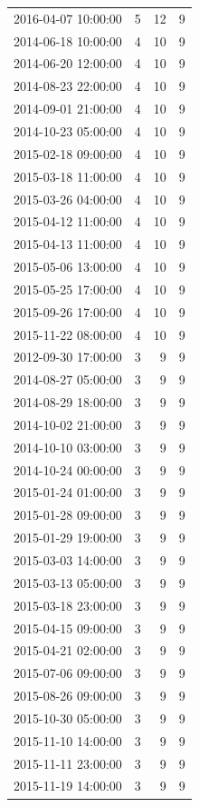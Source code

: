 \begin{tabular}{lrrr}
2016-04-07 10:00:00 & 5 & 12 & 9 \\
2014-06-18 10:00:00 & 4 & 10 & 9 \\
2014-06-20 12:00:00 & 4 & 10 & 9 \\
2014-08-23 22:00:00 & 4 & 10 & 9 \\
2014-09-01 21:00:00 & 4 & 10 & 9 \\
2014-10-23 05:00:00 & 4 & 10 & 9 \\
2015-02-18 09:00:00 & 4 & 10 & 9 \\
2015-03-18 11:00:00 & 4 & 10 & 9 \\
2015-03-26 04:00:00 & 4 & 10 & 9 \\
2015-04-12 11:00:00 & 4 & 10 & 9 \\
2015-04-13 11:00:00 & 4 & 10 & 9 \\
2015-05-06 13:00:00 & 4 & 10 & 9 \\
2015-05-25 17:00:00 & 4 & 10 & 9 \\
2015-09-26 17:00:00 & 4 & 10 & 9 \\
2015-11-22 08:00:00 & 4 & 10 & 9 \\
2012-09-30 17:00:00 & 3 & 9 & 9 \\
2014-08-27 05:00:00 & 3 & 9 & 9 \\
2014-08-29 18:00:00 & 3 & 9 & 9 \\
2014-10-02 21:00:00 & 3 & 9 & 9 \\
2014-10-10 03:00:00 & 3 & 9 & 9 \\
2014-10-24 00:00:00 & 3 & 9 & 9 \\
2015-01-24 01:00:00 & 3 & 9 & 9 \\
2015-01-28 09:00:00 & 3 & 9 & 9 \\
2015-01-29 19:00:00 & 3 & 9 & 9 \\
2015-03-03 14:00:00 & 3 & 9 & 9 \\
2015-03-13 05:00:00 & 3 & 9 & 9 \\
2015-03-18 23:00:00 & 3 & 9 & 9 \\
2015-04-15 09:00:00 & 3 & 9 & 9 \\
2015-04-21 02:00:00 & 3 & 9 & 9 \\
2015-07-06 09:00:00 & 3 & 9 & 9 \\
2015-08-26 09:00:00 & 3 & 9 & 9 \\
2015-10-30 05:00:00 & 3 & 9 & 9 \\
2015-11-10 14:00:00 & 3 & 9 & 9 \\
2015-11-11 23:00:00 & 3 & 9 & 9 \\
2015-11-19 14:00:00 & 3 & 9 & 9 \\

\end{tabular}

